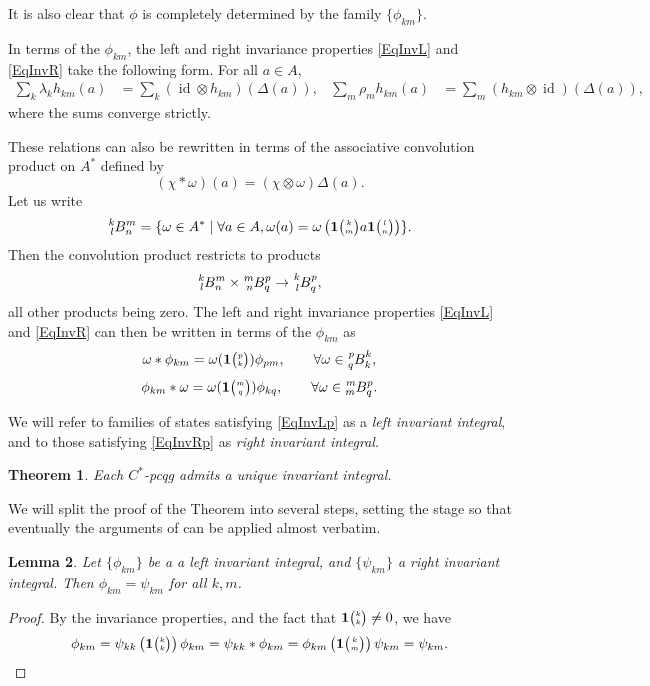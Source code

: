 \documentclass[11pt]{article}
\DeclareMathOperator{\id}{id}
\newcommand{\Grt}[3]{#1{\tiny {\begin{pmatrix} #2\\#3\end{pmatrix}}}}
\newcommand{\UnitC}[2]{\Grt{\mathbf{1}}{#1}{#2}}
\newcommand{\Gr}[5]{\tensor*[^{#2}_{#4}]{#1}{^{#3}_{#5}}}%
\newtheorem{Theorem}{Theorem}[section]
\newtheorem{Lem}[Theorem]{Lemma}
\theoremstyle{definition}
\numberwithin{equation}{section}
\begin{document}
It is also clear that $\phi$ is completely determined by the family
$\{\phi_{km}\}$.  

In terms of the $\phi_{km}$, the left and right invariance properties
\eqref{EqInvL} and \eqref{EqInvR} take the following form.  For all
$a\in A$,
\begin{align} \label{eq:invariance}
\sum_{k}  \lambda_{k} h_{km}(a) &= \sum_{k}  (\id \otimes
h_{km})(\Delta(a)), &
\sum_{m} \rho_{m} h_{km}(a) &= \sum_{m} (h_{km} \otimes \id)(\Delta(a)),
\end{align}
where the sums converge strictly.

These relations can also  be rewritten in terms of the associative
convolution product on $A^*$  defined by \[(\chi*\omega)(a) =
(\chi\otimes \omega)\Delta(a).\] Let us write \[\Gr{B}{k}{m}{l}{n} = \{\omega \in A^* \mid \forall a\in A, \omega(a) = \omega\left(\UnitC{k}{m}a\UnitC{l}{n}\right)\}.\] Then the convolution product restricts to products \[\Gr{B}{k}{m}{l}{n}\times \Gr{B}{m}{p}{n}{q}\rightarrow \Gr{B}{k}{p}{l}{q},\] all other products being zero. The left and right invariance properties \eqref{EqInvL} and \eqref{EqInvR} can then be written in terms of the $\phi_{km}$ as \begin{equation}\label{EqInvLp}\omega*\phi_{km} = \omega(\UnitC{p}{k})\phi_{pm},\qquad \forall \omega \in \Gr{B}{p}{k}{q}{k},\end{equation}
\begin{equation}\label{EqInvRp}\phi_{km}*\omega = \omega(\UnitC{m}{q})\phi_{kq},\qquad \forall \omega \in \Gr{B}{m}{p}{m}{q}.\end{equation}


We will refer to families of states satisfying \eqref{EqInvLp} as a \emph{left invariant integral}, and to those satisfying \eqref{EqInvRp} as \emph{right invariant integral}.

\begin{Theorem}\label{TheoInvInt} Each $C^*$-pcqg admits a unique invariant integral.
\end{Theorem} 

We will split the proof of the Theorem into several steps, setting the stage so that eventually the arguments of \cite{MVD1} can be applied almost verbatim. 

\begin{Lem} Let $\{\phi_{km}\}$ be a a left invariant integral, and $\{\psi_{km}\}$ a right invariant integral. Then $\phi_{km}= \psi_{km}$ for all $k,m$. 
\end{Lem} 
\begin{proof} By the invariance properties, and the fact that $\UnitC{k}{k}\neq 0$, we have \[\phi_{km}  = \psi_{kk}\left(\UnitC{k}{k}\right)\phi_{km} = \psi_{kk}*\phi_{km}= \phi_{km}\left(\UnitC{k}{m}\right)\psi_{km} = \psi_{km}.\]

\end{proof} 
\end{document}

